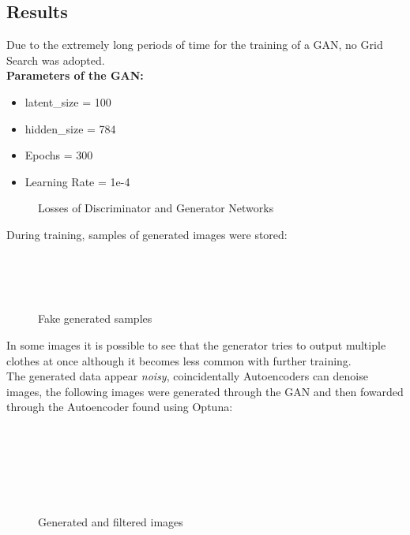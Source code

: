 \documentclass[11pt,a4paper,twocolumn]{IEEEtran}
\newcommand{\thinsepline}{\noindent\makebox[\linewidth]{\rule{7.5cm}{0.02pt}}}
\begin{document}
		\subsection{\textbf{Results}}
		Due to the extremely long periods of time for the training of a GAN, no Grid Search was adopted.
		\thinsepline\\
		\textbf{Parameters of the GAN:}
		\begin{itemize}
			\item latent\_size = 100
			\item hidden\_size = 784
			\item Epochs = 300
			\item Learning Rate = 1e-4
		\end{itemize}
		\thinsepline\newpage
		\begin{figure}[h]
			\centering
			
			\caption{Losses of Discriminator and Generator Networks}
			\label{fig:ganloss}
		\end{figure}
	During training, samples of generated images were stored:
	\begin{figure}[h]
		\centering
		\vspace*{-.7cm}\\
		\vspace*{-.7cm}\\
		\vspace*{-.5cm}\\
		\caption{Fake generated samples}
		\label{fig:ganimgs}
	\end{figure}
	In some images it is possible to see that the generator tries to output multiple clothes at once although it becomes less common with further training.\\
	The generated data appear \textit{noisy}, coincidentally Autoencoders can denoise images, the following images were generated through the GAN and then fowarded through the Autoencoder found using Optuna:
	\begin{figure}[h]
		\centering
		\vspace*{-.5cm}\\
		\vspace*{-.5cm}\\
		\vspace*{-.5cm}\\
		\vspace*{-.5cm}\\
		\vspace*{-.5cm}\\
		\caption{Generated and filtered images}
		\label{fig:filter}
	\end{figure}
\end{document}
